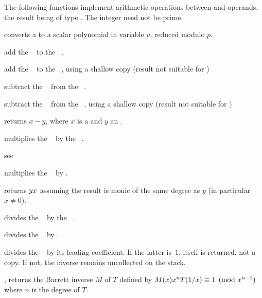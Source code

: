 The following functions implement arithmetic operations between 
and  operands, the result being of type . The integer
 need not be prime.

 converts a  to a scalar
polynomial in variable $v$, reduced modulo $p$.

 add the ~ to the
~.

 add the ~
to the ~, using a shallow copy (result not suitable for
)

 subtract the ~ from
the ~.

 subtract the
~ from the ~, using a shallow copy (result not
suitable for )

 returns $x - y$, where $x$ is
a  and $y$ an .

 multiplies the ~
by the ~.

 see 

 multiplies the ~
by .

 returns $y\*x$ assuming the
result is monic of the same degree as $y$ (in particular $x\neq 0$).

 divides the ~
by the ~.

 divides the ~
by .


 divides the ~ by its
leading coefficient. If the latter is~$1$,  itself is returned, not a
copy. If not, the inverse remains uncollected on the stack.

, returns the Barrett inverse
$M$ of $T$ defined by $M(x)\*x^n\*T(1/x)\equiv 1\pmod{x^{n-1}}$ where $n$ is
the degree of $T$.

